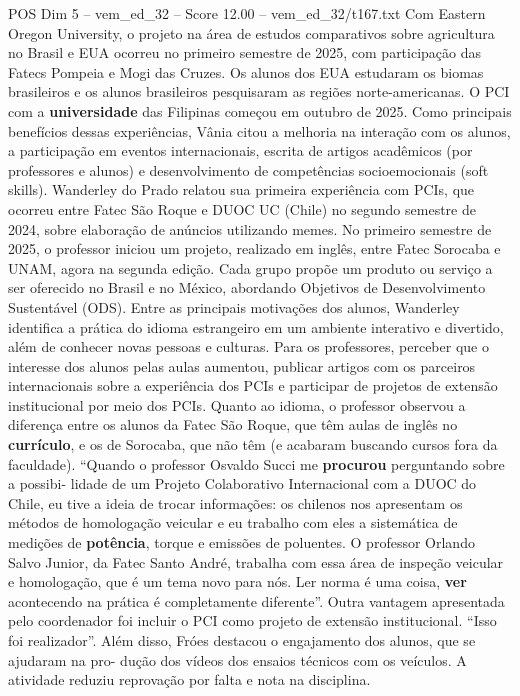 \begin{textsample}{POS Dim 5 – vem\_ed\_32 – Score 12.00 – vem\_ed\_32/t167.txt}
Com Eastern Oregon University, o projeto na área de estudos comparativos sobre agricultura no Brasil e EUA ocorreu no primeiro semestre de 2025, com participação das Fatecs Pompeia e Mogi das Cruzes.
Os alunos dos EUA estudaram os biomas brasileiros e os alunos brasileiros pesquisaram as regiões norte-americanas.
O PCI com a \textbf{universidade} das Filipinas começou em outubro de 2025.
Como principais benefícios dessas experiências, Vânia citou a melhoria na interação com os alunos, a participação em eventos internacionais, escrita de artigos acadêmicos (por professores e alunos) e desenvolvimento de competências socioemocionais (soft skills).
Wanderley do Prado relatou sua primeira experiência com PCIs, que ocorreu entre Fatec São Roque e DUOC UC (Chile) no segundo semestre de 2024, sobre elaboração de anúncios utilizando memes.
No primeiro semestre de 2025, o professor iniciou um projeto, realizado em inglês, entre Fatec Sorocaba e UNAM, agora na segunda edição.
Cada grupo propõe um produto ou serviço a ser oferecido no Brasil e no México, abordando Objetivos de Desenvolvimento Sustentável (ODS).
Entre as principais motivações dos alunos, Wanderley identifica a prática do idioma estrangeiro em um ambiente interativo e divertido, além de conhecer novas pessoas e culturas.
Para os professores, perceber que o interesse dos alunos pelas aulas aumentou, publicar artigos com os parceiros internacionais sobre a experiência dos PCIs e participar de projetos de extensão institucional por meio dos PCIs.
Quanto ao idioma, o professor observou a diferença entre os alunos da Fatec São Roque, que têm aulas de inglês no \textbf{currículo}, e os de Sorocaba, que não têm (e acabaram buscando cursos fora da faculdade). “Quando o professor Osvaldo Succi me \textbf{procurou} perguntando sobre a possibi- lidade de um Projeto Colaborativo Internacional com a DUOC do Chile, eu tive a ideia de trocar informações: os chilenos nos apresentam os métodos de homologação veicular e eu trabalho com eles a sistemática de medições de \textbf{potência}, torque e emissões de poluentes.
O professor Orlando Salvo Junior, da Fatec Santo André, trabalha com essa área de inspeção veicular e homologação, que é um tema novo para nós.
Ler norma é uma coisa, \textbf{ver} acontecendo na prática é completamente diferente”.
Outra vantagem apresentada pelo coordenador foi incluir o PCI como projeto de extensão institucional. “Isso foi realizador”.
Além disso, Fróes destacou o engajamento dos alunos, que se ajudaram na pro- dução dos vídeos dos ensaios técnicos com os veículos.
A atividade reduziu reprovação por falta e nota na disciplina.

\end{textsample}
